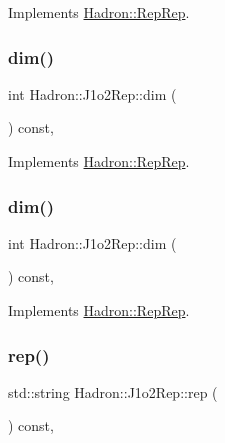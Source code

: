 Implements \mbox{\hyperlink{structHadron_1_1RepRep_a92c8802e5ed7afd7da43ccfd5b7cd92b}{Hadron\+::\+Rep\+Rep}}.

\mbox{\label{structHadron_1_1J1o2Rep_a2867fb4e13ae7883345606038d6b833b}} 
\subsubsection{\texorpdfstring{dim()}{dim()}\hspace{0.1cm}{\footnotesize\ttfamily [4/5]}}
{\footnotesize\ttfamily int Hadron\+::\+J1o2\+Rep\+::dim (\begin{DoxyParamCaption}{ }\end{DoxyParamCaption}) const\hspace{0.3cm}{\ttfamily [inline]}, {\ttfamily [virtual]}}



Implements \mbox{\hyperlink{structHadron_1_1RepRep_a92c8802e5ed7afd7da43ccfd5b7cd92b}{Hadron\+::\+Rep\+Rep}}.

\mbox{\label{structHadron_1_1J1o2Rep_a2867fb4e13ae7883345606038d6b833b}} 
\subsubsection{\texorpdfstring{dim()}{dim()}\hspace{0.1cm}{\footnotesize\ttfamily [5/5]}}
{\footnotesize\ttfamily int Hadron\+::\+J1o2\+Rep\+::dim (\begin{DoxyParamCaption}{ }\end{DoxyParamCaption}) const\hspace{0.3cm}{\ttfamily [inline]}, {\ttfamily [virtual]}}



Implements \mbox{\hyperlink{structHadron_1_1RepRep_a92c8802e5ed7afd7da43ccfd5b7cd92b}{Hadron\+::\+Rep\+Rep}}.

\mbox{\label{structHadron_1_1J1o2Rep_a4e049281173fb575d28821d31e36df00}} 
\subsubsection{\texorpdfstring{rep()}{rep()}\hspace{0.1cm}{\footnotesize\ttfamily [1/5]}}
{\footnotesize\ttfamily std\+::string Hadron\+::\+J1o2\+Rep\+::rep (\begin{DoxyParamCaption}{ }\end{DoxyParamCaption}) const\hspace{0.3cm}{\ttfamily [inline]}, {\ttfamily [virtual]}}



